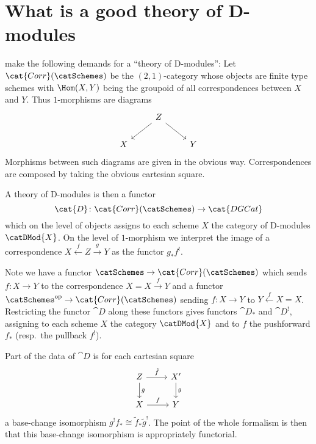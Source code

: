 \documentclass{ck-article}
\newcommand\catDGCat{\cat{DGCat}}
\newcommand\catCorrSch{\cat{Corr}(\catSchemes)}
\begin{document}
\section{What is a good theory of D-modules}

\cite{FrancisGaitsgory:2012:ChiralKoszulDuality} make the following demands for a \enquote{theory of D-modules}:
Let $\catCorrSch$ be the $(2,1)$-category whose objects are finite type schemes with $\Hom(X,Y)$ being the groupoid of all correspondences between $X$ and $Y$.
Thus $1$-morphisms are diagrams
\[
    \begin{tikzcd}
        & Z \arrow[dl] \arrow[dr] & \\
        X & & Y
    \end{tikzcd}
\]
Morphisms between such diagrams are given in the obvious way.
Correspondences are composed by taking the obvious cartesian square.

A theory of D-modules is then a functor
\[
    \cat{D}\colon \catCorrSch \to \catDGCat
\]
which on the level of objects assigns to each scheme $X$ the category of D-modules $\catDMod{X}$.
On the level of $1$-morphism we interpret the image of a correspondence $X \xleftarrow{f} Z \xrightarrow{g} Y$ as the functor $g_* f^!$.

Note we have a functor $\catSchemes \to \catCorrSch$ which sends $f\colon X \to Y$ to the correspondence $X = X \xrightarrow{f} Y$ and a functor $\catSchemes^{\mathrm{op}} \to \catCorrSch$ sending $f\colon X \to Y$ to $Y \xleftarrow{f} X = X$.
Restricting the functor $\cat{D}$ along these functors gives functors $\cat{D}_*$ and $\cat{D}^!$, assigning to each scheme $X$ the category $\catDMod{X}$ and to $f$ the pushforward $f_*$ (resp.~the pullback $f^!$).

Part of the data of $\cat{D}$ is for each cartesian square
\[
    \begin{tikzcd}
        Z \arrow[r, "\tilde f"] \arrow[d, "\tilde g"] & X' \arrow[d, "g"] \\
        X \arrow[r, "f"] & Y
    \end{tikzcd}
\]
a base-change isomorphism $g^!f_* \cong \tilde f_*\tilde g^!$.
The point of the whole formalism is then that this base-change isomorphism is appropriately functorial.
\end{document}
